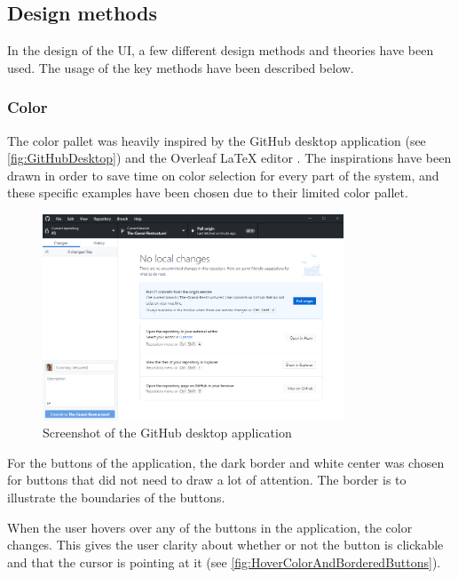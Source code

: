 \subsection{Design methods}
In the design of the UI, a few different design methods and theories have been used. The usage of the key methods have been described below.

\subsubsection*{Color}
The color pallet was heavily inspired by the GitHub desktop application (see \autoref{fig:GitHubDesktop}) and the Overleaf LaTeX editor \citep{GithubDesktop, Overleaf}. The inspirations have been drawn in order to save time on color selection for every part of the system, and these specific examples have been chosen due to their limited color pallet.

\begin{figure}[H]
    \centering
    \includegraphics[width=0.8\textwidth]{figures/UIDesignElements/GitHub_Desktop_Screenshot.png}
    \caption{Screenshot of the GitHub desktop application \citep{GithubDesktop}}
    \label{fig:GitHubDesktop}
\end{figure}

For the buttons of the application, the dark border and white center was chosen for buttons that did not need to draw a lot of attention. The border is to illustrate the boundaries of the buttons.
\par
When the user hovers over any of the buttons in the application, the color changes. This gives the user clarity about whether or not the button is clickable and that the cursor is pointing at it (see \autoref{fig:HoverColorAndBorderedButtons}).

